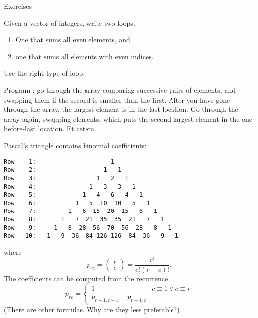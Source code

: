  {Exercises}

\begin{exercise}
  \label{ex:even-index}
  Given a vector of integers, write two loops;
  \begin{enumerate}
  \item One that sums all even elements, and
  \item one that sums all elements with even indices.
  \end{enumerate}
  Use the right type of loop.
\end{exercise}

\begin{exercise}
  Program : go through the array comparing
  successive pairs of elements, and swapping them if the second is
  smaller than the first. After you have gone through the array, the
  largest element is in the last location. Go through the array again,
  swapping elements, which puts the second largest element in the
  one-before-last location. Et cetera.
\end{exercise}

\begin{block}{Pascal's triangle}
  \label{sl:pascal-def}
  \small
   contains binomial coefficients:
{\scriptsize
\begin{verbatim}
Row    1:                     1
Row    2:                   1   1
Row    3:                 1   2   1
Row    4:               1   3   3   1
Row    5:             1   4   6   4   1
Row    6:           1   5  10  10   5   1
Row    7:         1   6  15  20  15   6   1
Row    8:       1   7  21  35  35  21   7   1
Row    9:     1   8  28  56  70  56  28   8   1
Row   10:   1   9  36  84 126 126  84  36   9   1
\end{verbatim}
}
where \[ p_{rc} = \begin{pmatrix} r\\c \end{pmatrix} = \frac{r!}{c!(r-c)! }. \]
The coefficients can be computed from the recurrence
\[ p_{rc} = 
\begin{cases}
  1&c\equiv 1\vee c\equiv r\\
  p_{r-1,c-1}+p_{r-1,c}
\end{cases}
\]
(There are other formulas. Why are they less preferable?)
\end{block}

